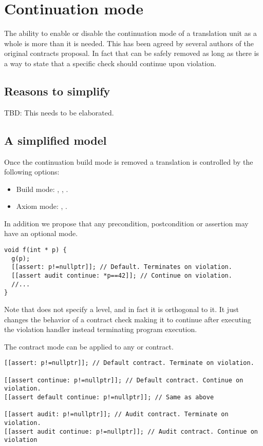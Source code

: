 \section{Continuation mode}
\label{sec:continue}

The ability to enable or disable the continuation mode of a translation unit as
a whole is more than it is needed. This has been agreed by several authors of
the original contracts proposal. In fact that can be safely removed as long as
there is a way to state that a specific check should continue upon violation.

\subsection{Reasons to simplify}

TBD: This needs to be elaborated.

\subsection{A simplified model}

Once the continuation build mode is removed a translation is controlled by the
following options:

\begin{itemize}
  \item Build mode: , , .
  \item Axiom mode: , .
\end{itemize}

In addition we propose that any precondition, postcondition or assertion may
have an optional mode. 

\begin{lstlisting}
void f(int * p) {
  g(p);
  [[assert: p!=nullptr]]; // Default. Terminates on violation.
  [[assert audit continue: *p==42]]; // Continue on violation.
  //...
}
\end{lstlisting}

Note that  does not specify a level, and in fact it is
orthogonal to it. It just changes the behavior of a contract check making it to
continue after executing the violation handler instead terminating program
execution.

The contract mode  can be applied to any  or
 contract.

\begin{lstlisting}
[[assert: p!=nullptr]]; // Default contract. Terminate on violation.

[[assert continue: p!=nullptr]]; // Default contract. Continue on violation.
[[assert default continue: p!=nullptr]]; // Same as above

[[assert audit: p!=nullptr]]; // Audit contract. Terminate on violation.
[[assert audit continue: p!=nullptr]]; // Audit contract. Continue on violation
\end{lstlisting}

